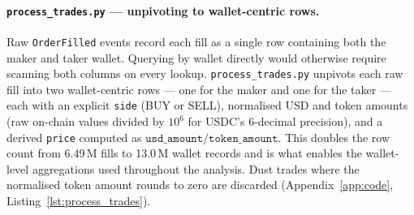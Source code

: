 \paragraph{\texttt{process\_trades.py} — unpivoting to wallet-centric rows.}
Raw \texttt{OrderFilled} events record each fill as a single row
containing both the maker and taker wallet.
Querying by wallet directly would otherwise require scanning both
columns on every lookup.
\texttt{process\_trades.py} unpivots each raw fill into two
wallet-centric rows — one for the maker and one for the taker —
each with an explicit \texttt{side} (BUY or SELL), normalised USD and
token amounts (raw on-chain values divided by $10^6$ for USDC's
6-decimal precision), and a derived \texttt{price} computed as
$\texttt{usd\_amount} / \texttt{token\_amount}$.
This doubles the row count from 6.49\,M fills to 13.0\,M wallet
records and is what enables the wallet-level aggregations used
throughout the analysis.
Dust trades where the normalised token amount rounds to zero are
discarded (Appendix~\ref{app:code}, Listing~\ref{lst:process_trades}).